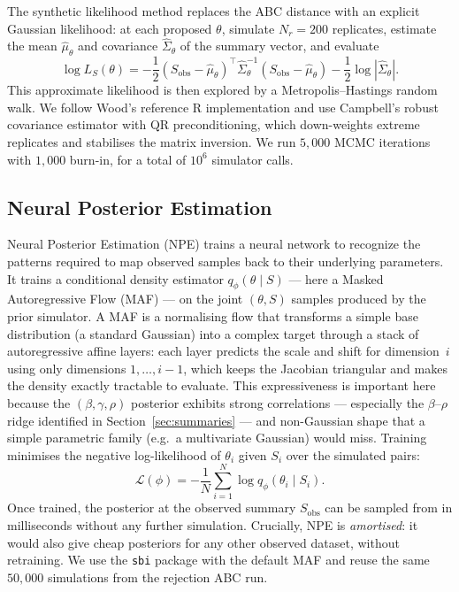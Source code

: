 \documentclass[11pt]{article}
\begin{document}
The synthetic likelihood method \citep{wood2010statistical} replaces the ABC distance with an explicit Gaussian likelihood: at each proposed $\theta$, simulate $N_r=200$ replicates, estimate the mean $\hat\mu_\theta$ and covariance $\hat\Sigma_\theta$ of the summary vector, and evaluate
\begin{equation}
\log L_S(\theta) = -\frac{1}{2}(S_{\text{obs}} - \hat\mu_\theta)^\top \hat\Sigma_\theta^{-1}(S_{\text{obs}} - \hat\mu_\theta) - \frac{1}{2}\log|\hat\Sigma_\theta|.
\end{equation}
This approximate likelihood is then explored by a Metropolis--Hastings random walk. We follow Wood's reference R implementation and use Campbell's robust covariance estimator with QR preconditioning, which down-weights extreme replicates and stabilises the matrix inversion. We run $5{,}000$ MCMC iterations with $1{,}000$ burn-in, for a total of $10^6$ simulator calls.

\subsection{Neural Posterior Estimation}

Neural Posterior Estimation (NPE) \citep{papamakarios2016fast, greenberg2019automatic} trains a neural network to recognize the patterns required to map observed samples back to their underlying parameters. It trains a conditional density estimator $q_\phi(\theta \mid S)$ --- here a Masked Autoregressive Flow (MAF) \citep{papamakarios2017masked} --- on the joint $(\theta, S)$ samples produced by the prior simulator. A MAF is a normalising flow that transforms a simple base distribution (a standard Gaussian) into a complex target through a stack of autoregressive affine layers: each layer predicts the scale and shift for dimension~$i$ using only dimensions $1,\dots,i{-}1$, which keeps the Jacobian triangular and makes the density exactly tractable to evaluate. This expressiveness is important here because the $(\beta,\gamma,\rho)$ posterior exhibits strong correlations --- especially the $\beta$--$\rho$ ridge identified in Section~\ref{sec:summaries} --- and non-Gaussian shape that a simple parametric family (e.g.\ a multivariate Gaussian) would miss. Training minimises the negative log-likelihood of $\theta_i$ given $S_i$ over the simulated pairs:
\begin{equation}
\mathcal{L}(\phi) = -\frac{1}{N}\sum_{i=1}^{N} \log q_\phi(\theta_i \mid S_i).
\end{equation}
Once trained, the posterior at the observed summary $S_{\text{obs}}$ can be sampled from in milliseconds without any further simulation. Crucially, NPE is \emph{amortised}: it would also give cheap posteriors for any other observed dataset, without retraining. We use the \texttt{sbi} package \citep{tejero2020sbi} with the default MAF and reuse the same $50{,}000$ simulations from the rejection ABC run.
\end{document}
